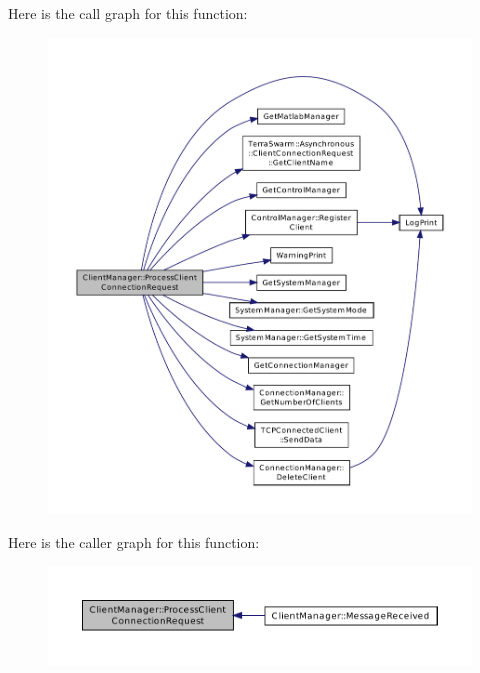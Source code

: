 Here is the call graph for this function\-:
\nopagebreak
\begin{figure}[H]
\begin{center}
\leavevmode
\includegraphics[width=350pt]{class_client_manager_a6d544b4d20cd3b906b6a033c8d70e4a5_cgraph}
\end{center}
\end{figure}




Here is the caller graph for this function\-:\nopagebreak
\begin{figure}[H]
\begin{center}
\leavevmode
\includegraphics[width=350pt]{class_client_manager_a6d544b4d20cd3b906b6a033c8d70e4a5_icgraph}
\end{center}
\end{figure}


